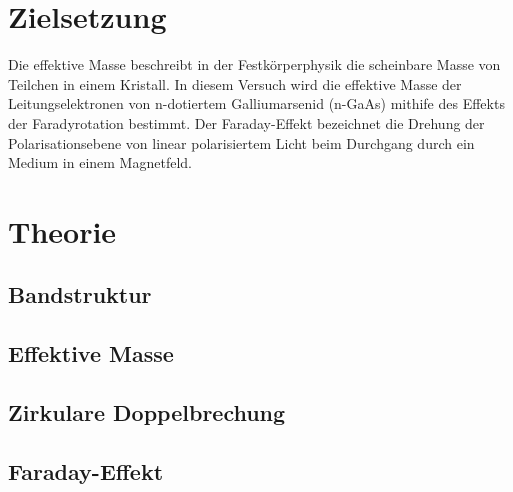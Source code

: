\section{Zielsetzung}
\label{sec:Zielsetzung}
Die effektive Masse beschreibt in der Festkörperphysik die scheinbare Masse von Teilchen in einem Kristall. In diesem Versuch wird die effektive Masse der Leitungselektronen von
n-dotiertem Galliumarsenid (n-GaAs) mithife des Effekts der Faradyrotation bestimmt. Der Faraday-Effekt bezeichnet die Drehung der Polarisationsebene von linear polarisiertem Licht
beim Durchgang durch ein Medium in einem Magnetfeld.

\section{Theorie}
\label{sec:Theorie}
\subsection{Bandstruktur}
\label{subsec:Bandstruktur}

\subsection{Effektive Masse}
\label{subsec:Effektive Masse}

\subsection{Zirkulare Doppelbrechung}
\label{subsec:Zirkulare Doppelbrechung}

\subsection{Faraday-Effekt}
\label{subsec:Faraday-Effekt}

